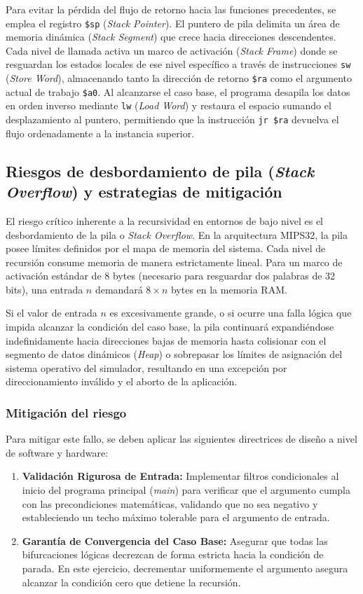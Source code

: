 \documentclass[12pt,letterpaper]{article}
\begin{document}
Para evitar la pérdida del flujo de retorno hacia las funciones precedentes, se emplea el registro \texttt{\$sp} (\textit{Stack Pointer}). El puntero de pila delimita un área de memoria dinámica (\textit{Stack Segment}) que crece hacia direcciones descendentes. Cada nivel de llamada activa un marco de activación (\textit{Stack Frame}) donde se resguardan los estados locales de ese nivel específico a través de instrucciones \texttt{sw} (\textit{Store Word}), almacenando tanto la dirección de retorno \texttt{\$ra} como el argumento actual de trabajo \texttt{\$a0}. Al alcanzarse el caso base, el programa desapila los datos en orden inverso mediante \texttt{lw} (\textit{Load Word}) y restaura el espacio sumando el desplazamiento al puntero, permitiendo que la instrucción \texttt{jr \$ra} devuelva el flujo ordenadamente a la instancia superior.

\subsection{Riesgos de desbordamiento de pila (\textit{Stack Overflow}) y estrategias de mitigación}
El riesgo crítico inherente a la recursividad en entornos de bajo nivel es el desbordamiento de la pila o \textit{Stack Overflow}. En la arquitectura MIPS32, la pila posee límites definidos por el mapa de memoria del sistema. Cada nivel de recursión consume memoria de manera estrictamente lineal. Para un marco de activación estándar de $8$ bytes (necesario para resguardar dos palabras de 32 bits), una entrada $n$ demandará $8 \times n$ bytes en la memoria RAM.

Si el valor de entrada $n$ es excesivamente grande, o si ocurre una falla lógica que impida alcanzar la condición del caso base, la pila continuará expandiéndose indefinidamente hacia direcciones bajas de memoria hasta colisionar con el segmento de datos dinámicos (\textit{Heap}) o sobrepasar los límites de asignación del sistema operativo del simulador, resultando en una excepción por direccionamiento inválido y el aborto de la aplicación.

\subsubsection{Mitigación del riesgo}
Para mitigar este fallo, se deben aplicar las siguientes directrices de diseño a nivel de software y hardware:
\begin{enumerate}
    \item \textbf{Validación Rigurosa de Entrada:} Implementar filtros condicionales al inicio del programa principal (\textit{main}) para verificar que el argumento cumpla con las precondiciones matemáticas, validando que no sea negativo y estableciendo un techo máximo tolerable para el argumento de entrada.
    \item \textbf{Garantía de Convergencia del Caso Base:} Asegurar que todas las bifurcaciones lógicas decrezcan de forma estricta hacia la condición de parada. En este ejercicio, decrementar uniformemente el argumento asegura alcanzar la condición cero que detiene la recursión.
\end{enumerate}
\end{document}
